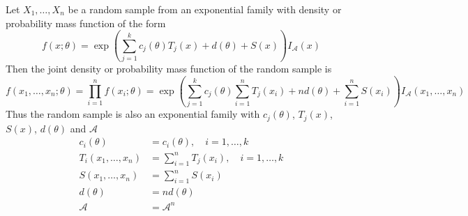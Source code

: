 \documentclass[answers,12pt,addpoints]{exam}
\begin{document}
\begin{remark}
     Let $X_1, \ldots, X_n$ be a random sample from an exponential family with density or probability mass function of the form
    $$ f(x; \theta) = \exp\left( \sum_{j=1}^{k} c_j(\theta)T_j(x) + d(\theta) + S(x) \right) I_{\mathcal{A}}(x)$$
    Then the joint density or probability mass function of the random sample is
    $$ f(x_1, \ldots, x_n; \theta) = \prod_{i=1}^{n} f(x_i; \theta) = \exp\left( \sum_{j=1}^{k} c_j(\theta) \sum_{i=1}^{n} T_j(x_i) + n d(\theta) + \sum_{i=1}^{n} S(x_i) \right) I_{\mathcal{A}}(x_1, \ldots, x_n)$$
    Thus the random sample is also an exponential family with $c_j(\theta)$, $T_j(x)$, $S(x)$, $d(\theta)$ and $\mathcal{A}$
    \begin{align*}
        c_i(\theta) &= c_i(\theta), \quad i = 1, \ldots, k\\
        T_i(x_1, \ldots, x_n) &= \sum_{i=1}^{n} T_j(x_i), \quad i = 1, \ldots, k\\
        S(x_1, \ldots, x_n) &= \sum_{i=1}^{n} S(x_i)\\
        d(\theta) &= n d(\theta)\\
        \mathcal{A} &= \mathcal{A}^n
    \end{align*}
\end{remark}
\end{document}
